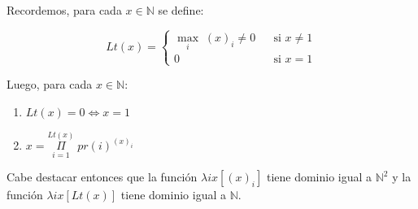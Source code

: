   \begin{lemma}
    \PN Recordemos, para cada $x \in \mathbb{N}$ se define:

    \[
      Lt(x) = \left\{\begin{array}{lll}
                      \max_{i} \; (x)_{i} \neq 0 && \text{si } x \neq 1 \\
                      0 & & \text{si } x = 1
                      \end{array} \right.
    \]

    \PN Luego, para cada $x \in \mathbb{N}$:

    \begin{enumerate}
      \item $Lt(x) = 0 \Leftrightarrow x = 1$
      \item $x = \underset{i=1}{\overset{Lt(x)}{\Pi}} \; pr(i)^{(x)_{i}}$
    \end{enumerate}

    \PN Cabe destacar entonces que la función $\lambda ix[(x)_{i}]$ tiene dominio igual a $\mathbb{N}^{2}$ y la
    función $\lambda ix[Lt(x)]$ tiene dominio igual a $\mathbb{N}$.
  \end{lemma}

